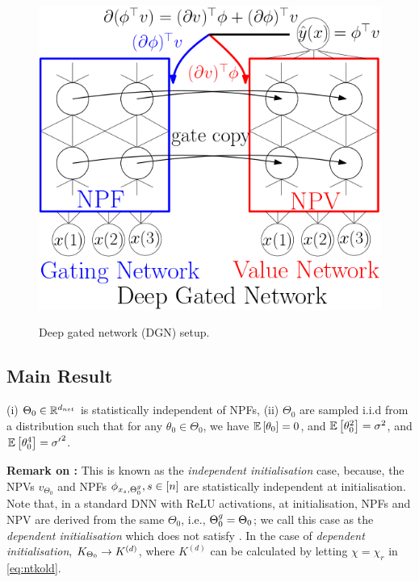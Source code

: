 \begin{figure}[h]
\begin{minipage}{0.29\columnwidth}
{\includegraphics[scale=0.5]{figs/nntwin-blck.png}
}
\end{minipage}
\caption{Deep gated network (DGN) setup.}
\label{fig:dgn}
\end{figure}

\subsection{Main Result}
\begin{assumption}\label{assmp:main}
(i) $\Theta_0\in\mathbb{R}^{d_{net}}$ is statistically independent of NPFs, (ii) $\Theta_0$ are sampled i.i.d from a distribution such that for any $\theta_0\in\Theta_0$,  we have $\mathbb{E}\left[\theta_0\right]=0$, and  $\mathbb{E}\left[\theta^2_0\right]=\sigma^2$, and $\mathbb{E}\left[\theta^4_0\right]={\sigma'}^2$.
\end{assumption}
\textbf{Remark on :} This is known as the \emph{independent initialisation} case, because, the NPVs $v_{\Theta_0}$ and NPFs $\phi_{x_s,{\Theta}^g_0},s\in[n]$ are statistically independent at initialisation. Note that, in a standard DNN with ReLU activations, at initialisation, NPFs and NPV are derived from the same $\Theta_0$, i.e., ${\Theta}^g_0=\Theta_0$; we call this case as the \emph{dependent initialisation} which does not satisfy . In the case of \emph{dependent initialisation}, $K_{\Theta_0}\rightarrow K^{(d)}$, where $K^{(d)}$ can be calculated by letting $\chi=\chi_{r}$ in \eqref{eq:ntkold}.%

